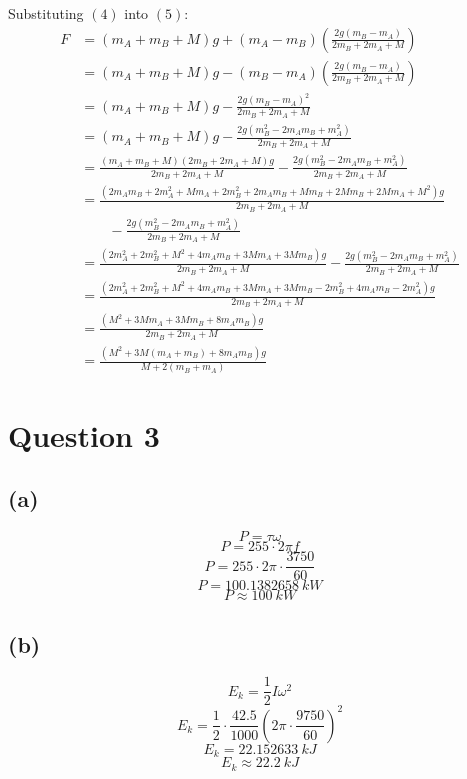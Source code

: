 \documentclass[11pt]{article}
\begin{document}
Substituting \((4)\) into \((5)\):
\begin{align*}
F &= (m_A + m_B + M)g + (m_A - m_B) \left( \frac{2g(m_B - m_A)}{2m_B + 2m_A + M} \right) \\
&= (m_A + m_B + M)g - (m_B - m_A) \left( \frac{2g(m_B - m_A)}{2m_B + 2m_A + M} \right) \\
&= (m_A + m_B + M)g - \frac{2g(m_B - m_A)^2}{2m_B + 2m_A + M} \\
&= (m_A + m_B + M)g - \frac{2g(m_B^2 - 2m_Am_B + m_A^2)}{2m_B + 2m_A + M} \\
&= \frac{(m_A + m_B + M)(2m_B + 2m_A + M)g}{2m_B + 2m_A + M} - \frac{2g(m_B^2 - 2m_Am_B + m_A^2)}{2m_B + 2m_A + M} \\
&= \frac{(2m_Am_B + 2m_A^2 + Mm_A + 2m_B^2 + 2m_Am_B + Mm_B + 2Mm_B + 2Mm_A + M^2)g}{2m_B + 2m_A + M} \\
&\qquad - \frac{2g(m_B^2 - 2m_Am_B + m_A^2)}{2m_B + 2m_A + M} \\
&= \frac{(2m_A^2 + 2m_B^2 + M^2 + 4m_Am_B + 3Mm_A + 3Mm_B)g}{2m_B + 2m_A + M} - \frac{2g(m_B^2 - 2m_Am_B + m_A^2)}{2m_B + 2m_A + M} \\
&= \frac{(2m_A^2 + 2m_B^2 + M^2 + 4m_Am_B + 3Mm_A + 3Mm_B - 2m_B^2 + 4m_Am_B - 2m_A^2)g}{2m_B + 2m_A + M} \\
&= \frac{(M^2 + 3Mm_A + 3Mm_B + 8m_Am_B)g}{2m_B + 2m_A + M} \\
&= \frac{(M^2 + 3M(m_A + m_B) + 8m_Am_B)g}{M + 2(m_B + m_A)}
\end{align*}

\newpage

\section{Question 3}
\label{sec:orgb5818e6}

\subsection{(a)}
\label{sec:orga92100f}
\[P = \tau \omega\]
\[P = 255 \cdot 2 \pi f\]
\[P = 255 \cdot 2 \pi \cdot \frac{3750}{60}\]
\[P = \qty{100.1382658}{\unit{kW}}\]
\[P \approx \qty{100}{\unit{kW}}\]


\subsection{(b)}
\label{sec:org9117258}
\[E_k = \frac{1}{2} I \omega^2\]
\[E_k = \frac{1}{2} \cdot \frac{42.5}{1000} \left(2 \pi \cdot \frac{9750}{60} \right)^2\]
\[E_k = \qty{22.152633}{\unit{kJ}}\]
\[E_k \approx \qty{22.2}{\unit{kJ}}\]
\end{document}
